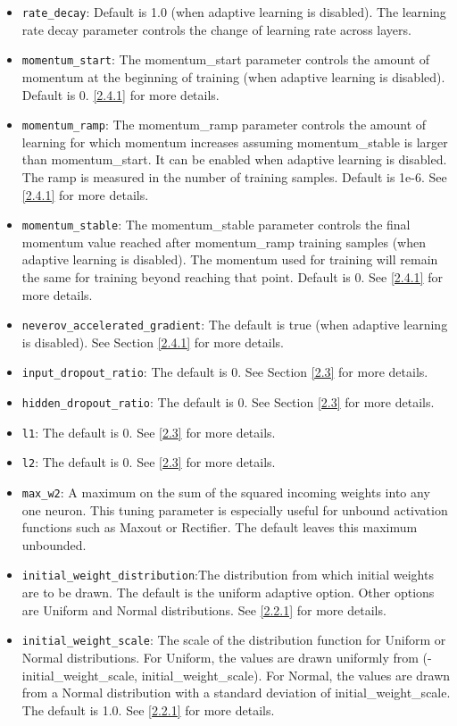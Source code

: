\documentclass[11pt]{article}
\begin{document}
\begin{itemize}
\item \texttt{rate\_decay}: Default is 1.0 (when adaptive learning is disabled). The learning rate decay parameter controls the change of learning rate across layers.
\item \texttt{momentum\_start}: The momentum\_start parameter controls the amount of momentum at the beginning of training (when adaptive learning is disabled). Default is 0. \ref{2.4.1} for more details.
\item \texttt{momentum\_ramp}: The momentum\_ramp parameter controls the amount of learning for which momentum increases assuming momentum\_stable is larger than momentum\_start. It can be enabled when adaptive learning is disabled. The ramp is measured in the number of training samples. Default is 1e-6. See \ref{2.4.1} for more details.
\item \texttt{momentum\_stable}: The momentum\_stable parameter controls the final momentum value reached after momentum\_ramp training samples (when adaptive learning is disabled). The momentum used for training will remain the same for training beyond reaching that point. Default is 0.  See \ref{2.4.1} for more details.
\item \texttt{neverov\_accelerated\_gradient}: The default is true (when adaptive learning is disabled). See Section \ref{2.4.1} for more details.
\item \texttt{input\_dropout\_ratio}: The default is 0. See Section \ref{2.3} for more details.
\item \texttt{hidden\_dropout\_ratio}: The default is 0. See Section \ref{2.3} for more details.
\item \texttt{l1}: The default is 0. See \ref{2.3} for more details.
\item \texttt{l2}: The default is 0. See \ref{2.3} for more details.
\item \texttt{max\_w2}: A maximum on the sum of the squared incoming weights into any one neuron. This tuning parameter is especially useful for unbound activation functions such as Maxout or Rectifier. The default leaves this maximum unbounded.
\item \texttt{initial\_weight\_distribution}:The distribution from which initial weights are to be drawn. The default is the uniform adaptive option. Other options are Uniform and Normal distributions. See \ref{2.2.1} for more details.
\item \texttt{initial\_weight\_scale}: The scale of the distribution function for Uniform or Normal distributions. For Uniform, the values are drawn uniformly from (-initial\_weight\_scale, initial\_weight\_scale). For Normal, the values are drawn from a Normal distribution with a standard deviation of initial\_weight\_scale. The default is 1.0. See \ref{2.2.1} for more details.

\end{itemize}
\end{document}
